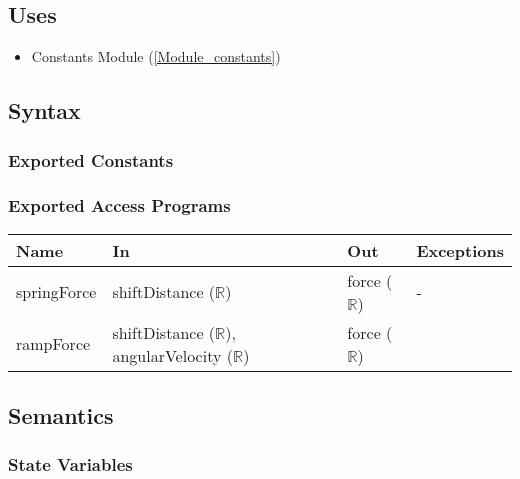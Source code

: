 \documentclass[12pt, titlepage]{article}
\begin{document}
\subsection{Uses}

\begin{itemize}
  \item Constants Module (\ref{Module_constants})
\end{itemize}

\subsection{Syntax}

\subsubsection{Exported Constants}

\subsubsection{Exported Access Programs}

\begin{center}
\begin{tabular}{p{2.5cm} p{4cm} p{4cm} p{2cm}}
\hline
\textbf{Name} & \textbf{In} & \textbf{Out} & \textbf{Exceptions} \\
\hline
springForce & shiftDistance ($\mathbb{R}$) & force ($\mathbb{R}$) & - \\
rampForce & shiftDistance ($\mathbb{R}$), angularVelocity ($\mathbb{R}$) & force ($\mathbb{R}$) & \\
\hline
\end{tabular}
\end{center}

\subsection{Semantics}

\subsubsection{State Variables}
\end{document}
